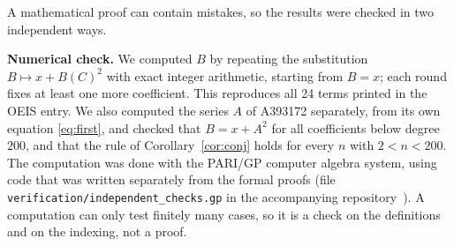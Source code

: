 \documentclass[11pt,a4paper]{article}
\theoremstyle{definition}
\theoremstyle{remark}
\newcommand{\para}[1]{\par\medskip\noindent\textbf{#1}\enspace}
\begin{document}
A mathematical proof can contain mistakes, so the results were checked in two independent ways.

\para{Numerical check.}
We computed $B$ by repeating the substitution $B\mapsto x+B(C)^2$ with exact integer arithmetic, starting
from $B=x$; each round fixes at least one more coefficient. This reproduces all 24 terms printed in the OEIS entry. We
also computed the series $A$ of A393172 separately, from its own equation \eqref{eq:first}, and checked that $B=x+A^2$
for all coefficients below degree $200$, and that the rule of Corollary~\ref{cor:conj} holds for every $n$ with
$2<n<200$.
The computation was done with the PARI/GP computer algebra system, using code that was written separately from the
formal proofs (file \texttt{verification/independent\_checks.gp} in the accompanying repository~\cite{repo}).
A computation can only test finitely many cases, so it is a check on the definitions and on the indexing, not a proof.
\end{document}
